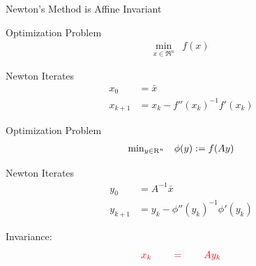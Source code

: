 \documentclass[9pt]{beamer}
\begin{document}
\begin{frame}{Newton's Method is Affine Invariant}


  
  \begin{minipage}{0.5\textwidth}

    Optimization Problem
    \[
      \begin{array}{rl}
        \min_{x\in \Re^n} & f(x)
      \end{array}
    \]

    \vfill

    Newton Iterates
    \[
      \begin{array}{rl}
        x_0 & = \bar x \\[0.5em]
              x_{k+1} & = x_k - f''(x_k)^{-1}f'(x_k)
      \end{array}
    \]

    \vfill

    \centering
    
  \end{minipage}%
  \hfill
  \begin{minipage}{0.5\textwidth}

    Optimization Problem
    \[
      \begin{array}{rl}
        \min_{y\in \mathrm{R}^n} & \phi(y):= f(A y)
      \end{array}
    \]

    \vfill

    Newton Iterates
    \[
      \begin{array}{rl}
        y_0 & = A^{-1} \bar x \\[0.5em]
        y_{k+1} & = y_k - \phi''(y_k)^{-1}\phi'(y_k)
      \end{array}
    \]

    \vfill
    
    \centering
    
  \end{minipage}
  \vfill

  Invariance:
  \[
    {\color{red} x_k\qquad=\qquad Ay_{k}}
  \]
\end{frame}
\end{document}
